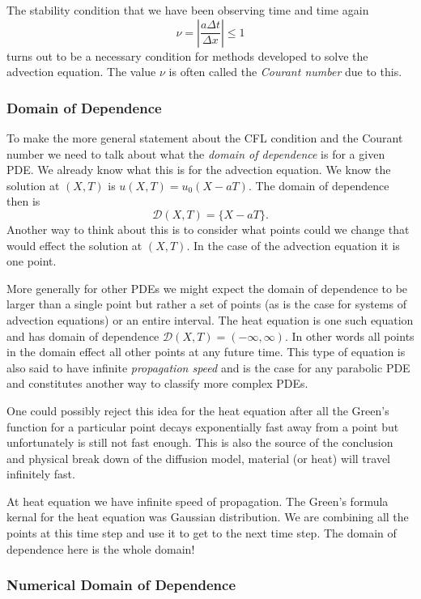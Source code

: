 \documentclass[11pt]{article}
\begin{document}
    The stability condition that we have been observing time and time again
\[
    \nu = \left | \frac{a \Delta t}{\Delta x} \right | \leq 1
\] turns out to be a necessary condition for methods developed to solve
the advection equation. The value \(\nu\) is often called the
\emph{Courant number} due to this.

    \hypertarget{domain-of-dependence}{%
\subsubsection{Domain of Dependence}\label{domain-of-dependence}}

To make the more general statement about the CFL condition and the
Courant number we need to talk about what the \emph{domain of
dependence} is for a given PDE. We already know what this is for the
advection equation. We know the solution at \((X, T)\) is
\(u(X, T) = u_0(X - a T)\). The domain of dependence then is \[
    \mathcal{D}(X,T) = \{X - a T\}.
\] Another way to think about this is to consider what points could we
change that would effect the solution at \((X,T)\). In the case of the
advection equation it is one point.

    More generally for other PDEs we might expect the domain of dependence
to be larger than a single point but rather a set of points (as is the
case for systems of advection equations) or an entire interval. The heat
equation is one such equation and has domain of dependence
\(\mathcal{D}(X, T) = (-\infty, \infty)\). In other words all points in
the domain effect all other points at any future time. This type of
equation is also said to have infinite \emph{propagation speed} and is
the case for any parabolic PDE and constitutes another way to classify
more complex PDEs.

One could possibly reject this idea for the heat equation after all the
Green's function for a particular point decays exponentially fast away
from a point but unfortunately is still not fast enough. This is also
the source of the conclusion and physical break down of the diffusion
model, material (or heat) will travel infinitely fast.

 At heat equation we have infinite speed of propagation. The Green's
formula kernal for the heat equation was Gaussian distribution. We are
combining all the points at this time step and use it to get to the next
time step. The domain of dependence here is the whole domain!

    \hypertarget{numerical-domain-of-dependence}{%
\subsubsection{Numerical Domain of
Dependence}\label{numerical-domain-of-dependence}}
\end{document}
